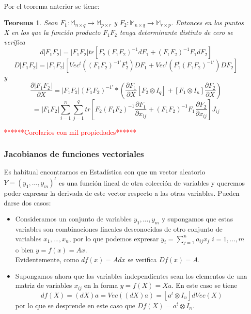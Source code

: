 \documentclass{article}
\theoremstyle{theorem-style}  %
\newtheorem{theorem}{Teorema}[section]  %
\theoremstyle{definition-style}
\theoremstyle{example-style}
\theoremstyle{exercise-style}
\begin{document}
	Por el teorema anterior se tiene:
	
	\begin{theorem}
		Sean $F_1: \mathbb{M}_{n\times q} \rightarrow \mathbb{M}_{p\times r}$ y $F_2: \mathbb{M}_{n\times q} \rightarrow \mathbb{M}_{r\times p}$. Entonces en los puntos X en los que la función producto $F_1F_2$ tenga determinante distinto de cero se verifica $$d|F_1F_2|=|F_1F_2|tr[F_2(F_1F_2)^{-1}dF_1+(F_1F_2)^{-1}F_1dF_2]$$
		$$D|F_1F_2|=|F_1F_2|\left[Vec^t\left( (F_1F_2)^{-1'} F_2^t\right)DF_1 + Vec^t\left(F_1^t(F_1F_2)^{-1'}\right)DF_2\right]$$
		y
		$$\frac{\partial |F_1F_2|}{\partial X} = |F_1F_2|(F_1F_2)^{-1'}* \left( \frac{\partial F_1}{\partial X}[F_2 \otimes I_q] + [F_1 \otimes I_n]\frac{\partial F_2}{\partial X} \right)$$
		$$= |F_1F_2|\sum_{i=1}^n \sum_{j=1}^q tr \left[ F_2(F_1F_2)^{-1}\frac{\partial F_1}{\partial x_{ij}} + (F_1F_2)^{-1}F_1\frac{\partial F_2}{\partial x_{ij}} \right]J_{ij}$$
	\end{theorem}
	
	\textcolor{red}{******Corolarios con mil propiedades******}
	
	\subsubsection{Jacobianos de funciones vectoriales}
	
	Es habitual encontrarnos en Estadística con que un vector aleatorio $Y=(y_1,...,y_m)^t$ es una función lineal de otra colección de variables y queremos poder expresar la derivada de este vector respecto a las otras variables. Pueden darse dos casos:
	
	\begin{itemize}
		\item Consideramos un conjunto de variables $y_1,...,y_m$ y supongamos que estas variables son combinaciones lineales desconocidas de otro conjunto de variables $x_1,...,x_n$, por lo que podemos expresar $y_i = \sum_{j=1}^n a_{ij}x_j$ $i=1,...,m$ o bien $y=f(x)=Ax$.
		\\Evidentemente, como $df(x) = Adx$ se verifica $Df(x)=A$.
		
		\item Supongamos ahora que las variables independientes sean los elementos de una matriz de variables $x_{ij}$ en la forma $y=f(X)=Xa$. En este caso se tiene
		$$df(X)=(dX)a = Vec((dX)a) = [a^t \otimes I_n]dVec(X)$$
		por lo que se desprende en este caso que $Df(X) = a^t\otimes I_n.$
	\end{itemize}
	
\end{document}
